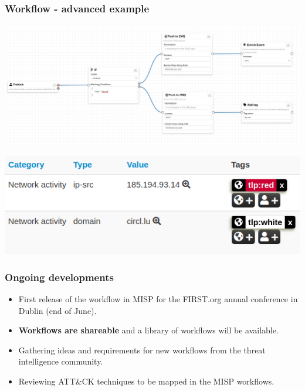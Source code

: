 \begin{frame}
    \frametitle{Workflow - advanced example}
    \vspace{-2em}
    \begin{center}
        \includegraphics[width=1.05\linewidth]{pictures/example-7.png}
    \end{center}
    \begin{center}
        \includegraphics[width=0.45\linewidth]{pictures/event-1.png}
    \end{center}
\end{frame}

\begin{frame}
    \frametitle{Ongoing developments}
    \begin{itemize}
        \item First release of the workflow in MISP for the FIRST.org annual conference in Dublin (end of June).
        \item {\bf Workflows are shareable} and a library of workflows will be available.
        \item Gathering ideas and requirements for new workflows from the threat intelligence community.
        \item Reviewing ATT\&CK techniques to be mapped in the MISP workflows.
    \end{itemize}
\end{frame}

